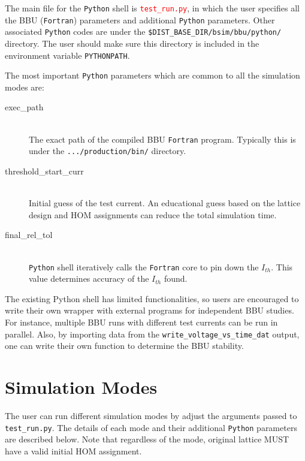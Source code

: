 \documentclass{hitec}
\newcommand{\Newline}{\hfil \\}
\begin{document}
The main file for the \texttt{Python} shell is \textcolor{red}{\texttt{test_run.py}}, in which the user specifies all the BBU (\texttt{Fortran}) parameters and additional \texttt{Python} parameters. Other associated \texttt{Python} codes are under the \texttt{\$DIST_BASE_DIR/bsim/bbu/python/} directory. The user should make sure this directory is included in the environment variable \texttt{PYTHONPATH}.

The most important \texttt{Python} parameters which are common to all the simulation modes are:

\begin{description}
\item[exec_path] \Newline
The exact path of the compiled BBU \texttt{Fortran} program. Typically this is under the \texttt{.../production/bin/} directory. 
%
\item[threshold_start_curr] \Newline
Initial guess of the test current. An educational guess based on the lattice design and HOM assignments can reduce the total simulation time. 
%
\item[final_rel_tol] \Newline
\texttt{Python} shell iteratively calls the  \texttt{Fortran} core to pin down the $I_{th}$. This value determines accuracy of the $I_{th}$ found.
\end{description}

The existing Python shell has limited functionalities, so users are encouraged to write their own wrapper with external programs for independent BBU studies. For instance, multiple BBU runs with different test currents can be run in parallel. Also, by importing data from the \texttt{write_voltage_vs_time_dat} output, one can write their own function to determine the BBU stability.  
\section{Simulation Modes}
The user can run different simulation modes by adjust the arguments passed to  \texttt{test_run.py}. The details of each mode and their additional \texttt{Python} parameters are described below. Note that regardless of the mode, original lattice MUST have a valid initial HOM assignment. 

\end{document}
